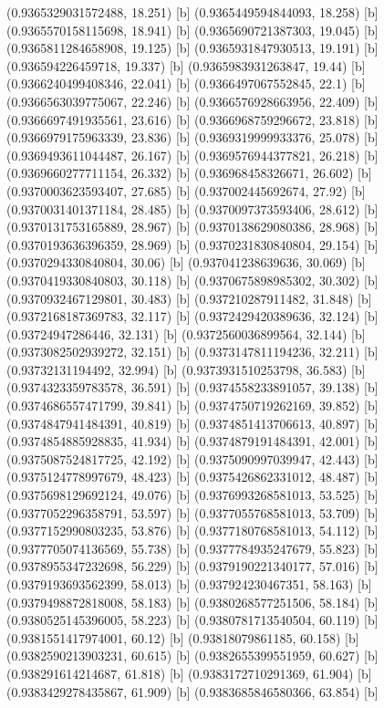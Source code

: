{{{(0.9365329031572488, 18.251) [b] 
(0.9365449594844093, 18.258) [b] 
(0.9365570158115698, 18.941) [b] 
(0.9365690721387303, 19.045) [b] 
(0.9365811284658908, 19.125) [b] 
(0.9365931847930513, 19.191) [b] 
(0.936594226459718, 19.337) [b] 
(0.9365983931263847, 19.44) [b] 
(0.9366240499408346, 22.041) [b] 
(0.9366497067552845, 22.1) [b] 
(0.9366563039775067, 22.246) [b] 
(0.9366576928663956, 22.409) [b] 
(0.9366697491935561, 23.616) [b] 
(0.9366968759296672, 23.818) [b] 
(0.9366979175963339, 23.836) [b] 
(0.9369319999933376, 25.078) [b] 
(0.9369493611044487, 26.167) [b] 
(0.9369576944377821, 26.218) [b] 
(0.9369660277711154, 26.332) [b] 
(0.936968458326671, 26.602) [b] 
(0.9370003623593407, 27.685) [b] 
(0.937002445692674, 27.92) [b] 
(0.9370031401371184, 28.485) [b] 
(0.9370097373593406, 28.612) [b] 
(0.9370131753165889, 28.967) [b] 
(0.9370138629080386, 28.968) [b] 
(0.9370193636396359, 28.969) [b] 
(0.9370231830840804, 29.154) [b] 
(0.9370294330840804, 30.06) [b] 
(0.937041238639636, 30.069) [b] 
(0.9370419330840803, 30.118) [b] 
(0.9370675898985302, 30.302) [b] 
(0.9370932467129801, 30.483) [b] 
(0.937210287911482, 31.848) [b] 
(0.9372168187369783, 32.117) [b] 
(0.9372429420389636, 32.124) [b] 
(0.93724947286446, 32.131) [b] 
(0.9372560036899564, 32.144) [b] 
(0.9373082502939272, 32.151) [b] 
(0.9373147811194236, 32.211) [b] 
(0.93732131194492, 32.994) [b] 
(0.9373931510253798, 36.583) [b] 
(0.9374323359783578, 36.591) [b] 
(0.9374558233891057, 39.138) [b] 
(0.9374686557471799, 39.841) [b] 
(0.9374750719262169, 39.852) [b] 
(0.9374847941484391, 40.819) [b] 
(0.9374851413706613, 40.897) [b] 
(0.9374854885928835, 41.934) [b] 
(0.9374879191484391, 42.001) [b] 
(0.9375087524817725, 42.192) [b] 
(0.9375090997039947, 42.443) [b] 
(0.9375124778997679, 48.423) [b] 
(0.9375426862331012, 48.487) [b] 
(0.9375698129692124, 49.076) [b] 
(0.9376993268581013, 53.525) [b] 
(0.9377052296358791, 53.597) [b] 
(0.9377055768581013, 53.709) [b] 
(0.9377152990803235, 53.876) [b] 
(0.9377180768581013, 54.112) [b] 
(0.9377705074136569, 55.738) [b] 
(0.9377784935247679, 55.823) [b] 
(0.9378955347232698, 56.229) [b] 
(0.9379190221340177, 57.016) [b] 
(0.9379193693562399, 58.013) [b] 
(0.937924230467351, 58.163) [b] 
(0.9379498872818008, 58.183) [b] 
(0.9380268577251506, 58.184) [b] 
(0.9380525145396005, 58.223) [b] 
(0.9380781713540504, 60.119) [b] 
(0.9381551417974001, 60.12) [b] 
(0.93818079861185, 60.158) [b] 
(0.9382590213903231, 60.615) [b] 
(0.9382655399551959, 60.627) [b] 
(0.938291614214687, 61.818) [b] 
(0.9383172710291369, 61.904) [b] 
(0.9383429278435867, 61.909) [b] 
(0.9383685846580366, 63.854) [b] 
}}}
